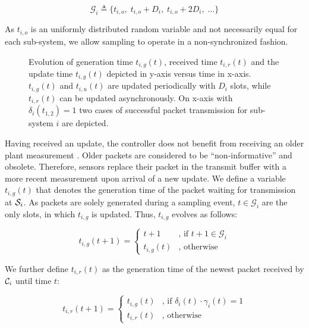 \begin{equation}
  \mathcal{G}_i \triangleq \lbrace t_{i,o}, \; t_{i,o} + D_{i}, \; t_{i,o} + 2 D_{i}, \; \dots \rbrace 
\end{equation}

As $t_{i,o}$ is an uniformly distributed random variable and not necessarily
equal for each sub-system, we allow sampling to operate in a non-synchronized
fashion. 

\begin{figure}[htb]
  \centering
  \resizebox*{.5\textwidth}{!}{} 
  \caption[Example evolution of generation time $t_{i,g}$, received time
  $t_{i,r}$ and update time $t_{i,g}$]{Evolution of generation time
  $t_{i,g}(t)$, received time $t_{i,r}(t)$ and the update time $t_{i,g}(t)$
  depicted in y-axis versus time in x-axis. $t_{i,g}(t)$ and $t_{i,u}(t)$ are
  updated periodically with $D_i$ slots, while $t_{i,r}(t)$ can be updated
  asynchronously. On x-axis with $\delta_i(t_{1,2})=1$ two cases of successful
  packet transmission for sub-system $i$ are depicted.}
  \label{fig:ageplot}
\end{figure}  

Having received an update, the controller does not benefit from receiving an
older plant measurement \cite{costa2016age}. Older packets are considered to be
``non-informative'' and obsolete. Therefore, sensors replace their packet in the
transmit buffer with a more recent measurement upon arrival of a new update. We
define a variable $t_{i,g}(t)$ that denotes the generation time of the packet
waiting for transmission at $\mathcal{S}_i$. As packets are solely generated during a
sampling event, $t \in \mathcal{G}_i$ are the only slots, in which $t_{i,g}$ is
updated. Thus, $t_{i,g}$ evolves as follows:

\begin{equation}
  t_{i,g}(t+1) =
  \begin{cases}
  t+1 & \text{, if } t+1 \in \mathcal{G}_i \\
  t_{i,g}(t) & \text{, otherwise}	
  \end{cases}
\end{equation}

We further define $t_{i,r}(t)$ as the generation time of the newest packet
received by $\mathcal{C}_i$ until time $t$:

\begin{equation}
  t_{i, r}(t+1) =
  \begin{cases}
  t_{i, g}(t) & \text{, if } \delta_i(t) \cdot \gamma_i(t) = 1 \\
  t_{i, r}(t) & \text{, otherwise}	
  \end{cases}
\end{equation}

